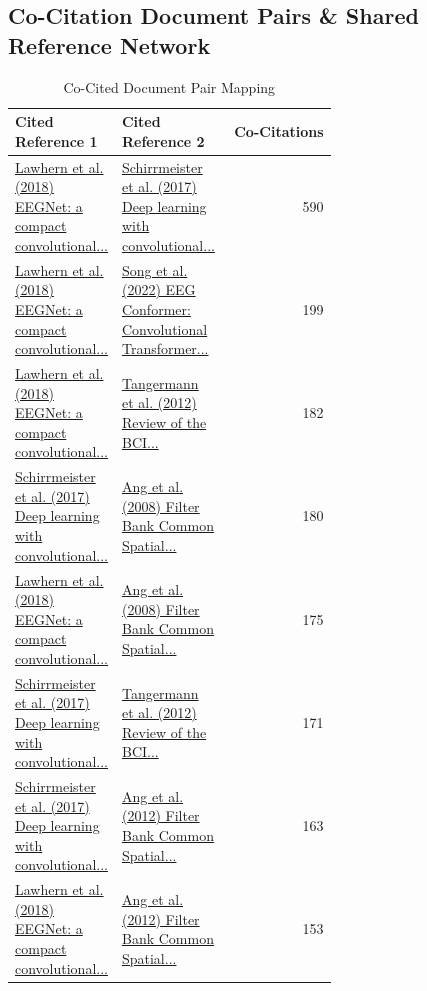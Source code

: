 \subsection{Co-Citation Document Pairs \& Shared Reference Network}
\begin{table}[htbp]
\caption{Co-Cited Document Pair Mapping}
\label{tab:CoCitationLabels}
\scriptsize
\setlength{\tabcolsep}{4pt}
\begin{tabular}{p{0.32\linewidth} p{0.32\linewidth} r}
\toprule
\textbf{Cited Reference 1} & \textbf{Cited Reference 2} & \textbf{Co-Citations} \\
\midrule
\href{https://doi.org/10.1088/1741-2552/aace8c}{Lawhern et al. (2018) EEGNet: a compact convolutional...} & \href{https://doi.org/10.1002/hbm.23730}{Schirrmeister et al. (2017) Deep learning with convolutional...} & 590 \\
\href{https://doi.org/10.1088/1741-2552/aace8c}{Lawhern et al. (2018) EEGNet: a compact convolutional...} & \href{https://doi.org/10.1109/tnsre.2022.3230250}{Song et al. (2022) EEG Conformer: Convolutional Transformer...} & 199 \\
\href{https://doi.org/10.1088/1741-2552/aace8c}{Lawhern et al. (2018) EEGNet: a compact convolutional...} & \href{https://doi.org/10.3389/fnins.2012.00055}{Tangermann et al. (2012) Review of the BCI...} & 182 \\
\href{https://doi.org/10.1002/hbm.23730}{Schirrmeister et al. (2017) Deep learning with convolutional...} & \href{https://doi.org/10.1109/ijcnn.2008.4634130}{Ang et al. (2008) Filter Bank Common Spatial...} & 180 \\
\href{https://doi.org/10.1088/1741-2552/aace8c}{Lawhern et al. (2018) EEGNet: a compact convolutional...} & \href{https://doi.org/10.1109/ijcnn.2008.4634130}{Ang et al. (2008) Filter Bank Common Spatial...} & 175 \\
\href{https://doi.org/10.1002/hbm.23730}{Schirrmeister et al. (2017) Deep learning with convolutional...} & \href{https://doi.org/10.3389/fnins.2012.00055}{Tangermann et al. (2012) Review of the BCI...} & 171 \\
\href{https://doi.org/10.1002/hbm.23730}{Schirrmeister et al. (2017) Deep learning with convolutional...} & \href{https://doi.org/10.3389/fnins.2012.00039}{Ang et al. (2012) Filter Bank Common Spatial...} & 163 \\
\href{https://doi.org/10.1088/1741-2552/aace8c}{Lawhern et al. (2018) EEGNet: a compact convolutional...} & \href{https://doi.org/10.3389/fnins.2012.00039}{Ang et al. (2012) Filter Bank Common Spatial...} & 153 \\

\end{tabular}
\end{table}
